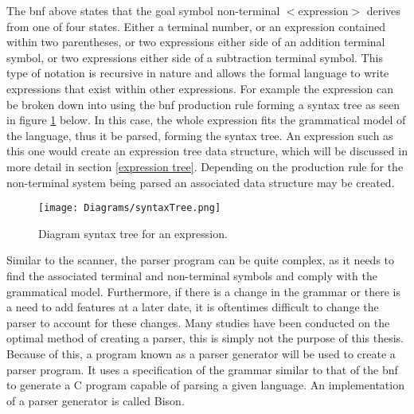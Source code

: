 \noindent
The \acrshort{bnf} above states that the goal symbol non-terminal $<$expression$>$ derives from one of four states. Either a terminal number, or an expression contained within two parentheses, or two expressions either side of an addition terminal symbol, or two expressions either side of a subtraction terminal symbol. This type of notation is recursive in nature and allows the formal language to write expressions that exist within other expressions. For example the expression  can be broken down into using the \acrshort{bnf} production rule forming a syntax tree as seen in figure \ref{syntax tree} below. In this case, the whole expression fits the grammatical model of the language, thus it be parsed, forming the syntax tree. An expression such as this one would create an expression tree data structure, which will be discussed in more detail in section \ref{expression tree}. Depending on the production rule for the non-terminal system being parsed an associated data structure may be created.

\begin{figure}[htbp]
	{\centering
		\vspace{7px}
		
		\texttt{[image: Diagrams/syntaxTree.png]}
		
		\caption{Diagram syntax tree for an expression.} \label{syntax tree}
	}
\end{figure}
\FloatBarrier

\noindent
Similar to the scanner, the parser program can be quite complex, as it needs to find the associated terminal and non-terminal symbols and comply with the grammatical model. Furthermore, if there is a change in the grammar or there is a need to add features at a later date, it is oftentimes difficult to change the parser to account for these changes. Many studies have been conducted on the optimal method of creating a parser, this is simply not the purpose of this thesis. Because of this, a program known as a parser generator will be used to create a parser program. It uses a specification of the grammar similar to that of the \acrshort{bnf} to generate a C program capable of parsing a given language. An implementation of a parser generator is called Bison.

